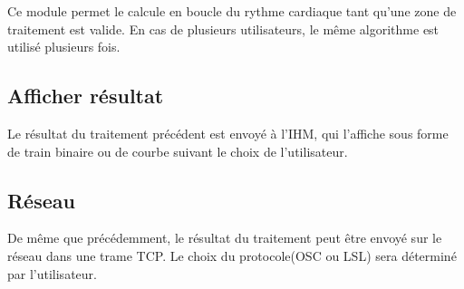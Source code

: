 \documentclass[12pt,a4paper]{article}
\begin{document}
Ce module permet le calcule en boucle du rythme cardiaque tant qu'une zone de traitement est valide. 
En cas de plusieurs utilisateurs, le même algorithme est utilisé plusieurs fois.



\subsection*{Afficher résultat}

Le résultat du traitement précédent est envoyé à l'IHM, qui l'affiche sous forme de train binaire ou de courbe suivant le choix de l'utilisateur.

\subsection*{Réseau}

De même que précédemment, le résultat du traitement peut être envoyé sur le réseau dans une trame TCP. Le choix du protocole(OSC ou LSL) sera déterminé par l'utilisateur.
\end{document}
